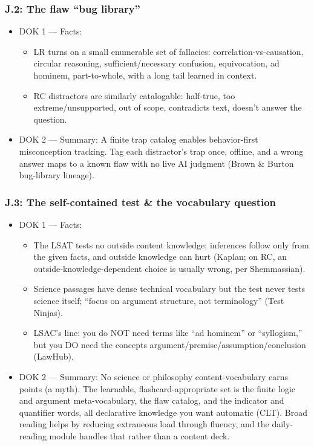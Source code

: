 \documentclass[11pt]{article}
\begin{document}
\subsubsection*{J.2: The flaw \enquote{bug library}}
\begin{itemize}
\item DOK 1 --- Facts:
\begin{itemize}
\item LR turns on a small enumerable set of fallacies: correlation-vs-causation, circular reasoning, sufficient/necessary confusion, equivocation, ad hominem, part-to-whole, with a long tail learned in context.
\item RC distractors are similarly catalogable: half-true, too extreme/unsupported, out of scope, contradicts text, doesn't answer the question.
\end{itemize}
\item DOK 2 --- Summary: A finite trap catalog enables behavior-first misconception tracking. Tag each distractor's trap once, offline, and a wrong answer maps to a known flaw with no live AI judgment (Brown \& Burton bug-library lineage).
\end{itemize}
\subsubsection*{J.3: The self-contained test \& the vocabulary question}
\begin{itemize}
\item DOK 1 --- Facts:
\begin{itemize}
\item The LSAT tests no outside content knowledge; inferences follow only from the given facts, and outside knowledge can hurt (Kaplan; on RC, an outside-knowledge-dependent choice is usually wrong, per Shemmassian).
\item Science passages have dense technical vocabulary but the test never tests science itself; \enquote{focus on argument structure, not terminology} (Test Ninjas).
\item LSAC's line: you do NOT need terms like \enquote{ad hominem} or \enquote{syllogism,} but you DO need the concepts argument/premise/assumption/conclusion (LawHub).
\end{itemize}
\item DOK 2 --- Summary: No science or philosophy content-vocabulary earns points (a myth). The learnable, flashcard-appropriate set is the finite logic and argument meta-vocabulary, the flaw catalog, and the indicator and quantifier words, all declarative knowledge you want automatic (CLT). Broad reading helps by reducing extraneous load through fluency, and the daily-reading module handles that rather than a content deck.
\end{itemize}
\end{document}

